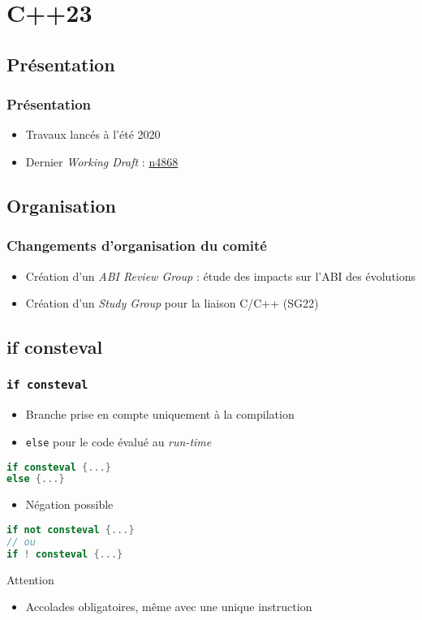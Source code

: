\documentclass[C++.tex]{subfiles}
\begin{document}
\section{C++23}
\subsection*{Présentation}
\begin{frame}
	\frametitle{Présentation}
	\begin{itemize}
		\item Travaux lancés à l'été 2020
		\item Dernier \textit{Working Draft} : \href{https://github.com/cplusplus/draft/releases/download/n4868/n4868.pdf}{n4868}
	\end{itemize}
\end{frame}

\subsection*{Organisation}
\begin{frame}
	\frametitle{Changements d'organisation du comité}
	\begin{itemize}
		\item Création d'un \textit{ABI Review Group} : étude des impacts sur l'ABI des évolutions
		\item Création d'un \textit{Study Group} pour la liaison C/C++ (SG22)
	\end{itemize}
\end{frame}

\subsection*{if consteval}
\begin{frame}[fragile]
	\frametitle{\lstinline|if consteval|}
	\begin{itemize}
		\item Branche prise en compte uniquement à la compilation
		\item \lstinline|else| pour le code évalué au \textit{run-time}
	\end{itemize}

	\begin{lstlisting}[language=C++]
if consteval {...}
else {...}\end{lstlisting}

	\begin{itemize}
		\item Négation possible
	\end{itemize}

	\begin{lstlisting}[language=C++]
if not consteval {...}
// ou
if ! consteval {...}\end{lstlisting}

	\begin{alertblock}{Attention}
		\begin{itemize}
			\item Accolades obligatoires, même avec une unique instruction
		\end{itemize}
	\end{alertblock}
\end{frame}
\end{document}
